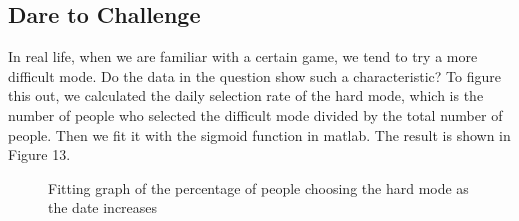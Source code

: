 \documentclass[12pt]{article}
\begin{document}
\subsection{Dare to Challenge}
In real life, when we are familiar with a certain game, we tend to try a more difficult mode. Do the data in the question show such a characteristic?
To figure this out, we calculated the daily selection rate of the hard mode, which is the number of people who selected the difficult mode divided by the total number of people. Then we fit it with the sigmoid function in matlab. The result is shown in Figure 13.
\begin{figure}[htbp]
    \centering
     \caption{Fitting graph of the percentage of people choosing the hard mode as the date increases}
 \end{figure}
\end{document}
